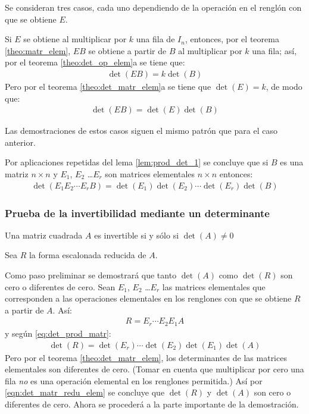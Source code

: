 \documentclass[a4paper,12pt]{article}
\begin{document}
\demo Se consideran tres casos, cada uno dependiendo de la operación en el
renglón con que se obtiene $E$.

 Si $E$ se obtiene al multiplicar por $k$ una fila de $I_n$, entonces,
por el teorema \ref{theo:matr_elem}, $EB$ se obtiene a partir de $B$ al
multiplicar por $k$ una fila; así, por el teorema \ref{theo:det_op_elem}a se
tiene que:
\begin{align*}
  \det(EB)=k\det(B)
\end{align*}
Pero por el teorema \ref{theo:det_matr_elem}a se tiene que $\det(E)=k$, de
modo que:
\begin{align*}
  \det(EB)=\det(E)\det(B)
\end{align*}

 Las demostraciones de estos casos siguen el mismo patrón que para
el caso anterior.

\obse Por aplicaciones repetidas del lema \ref{lem:prod_det_1} se concluye que
si $B$ es una matriz $n\times n$ y $E_1$, $E_2$ \ldots $E_r$ son matrices
elementales $n\times n$ entonces:
\begin{align}
  \det(E_1E_2\cdots E_rB)=\det(E_1)\det(E_2)\cdots\det(E_r)\det(B)
  \label{eq:det_prod_matr}
\end{align}

\subsubsection{Prueba de la invertibilidad mediante un determinante}

\begin{theorem}
  Una matriz cuadrada $A$ es invertible si y sólo si $\det(A)\ne0$
  \label{theo:proof_inv_matr}
\end{theorem}

\demo Sea $R$ la forma escalonada reducida de $A$.

Como paso preliminar se demostrará que tanto $\det(A)$ como $\det(R)$ son cero
o diferentes de cero. Sean $E_1$, $E_2$ \ldots $E_r$ las matrices elementales
que corresponden a las operaciones elementales en los renglones con que se
obtiene $R$ a partir de $A$. Así:
\begin{align*}
  R=E_r\cdots E_2E_1A
\end{align*}
y según \eqref{eq:det_prod_matr}:
\begin{align}
  \det(R)=\det(E_r)\cdots\det(E_2)\det(E_1)\det(A)
  \label{eqn:det_matr_redu_elem}
\end{align}
Pero por el teorema \ref{theo:det_matr_elem}, los determinantes de las
matrices elementales son diferentes de cero. (Tomar en cuenta que multiplicar
por cero una fila \emph{no} es una operación elemental en los renglones
permitida.) Así por \eqref{eqn:det_matr_redu_elem} se concluye que
$\det(R)$ y $\det(A)$ son cero o diferentes de cero. Ahora se procederá a la
parte importante de la demostración.
\end{document}
